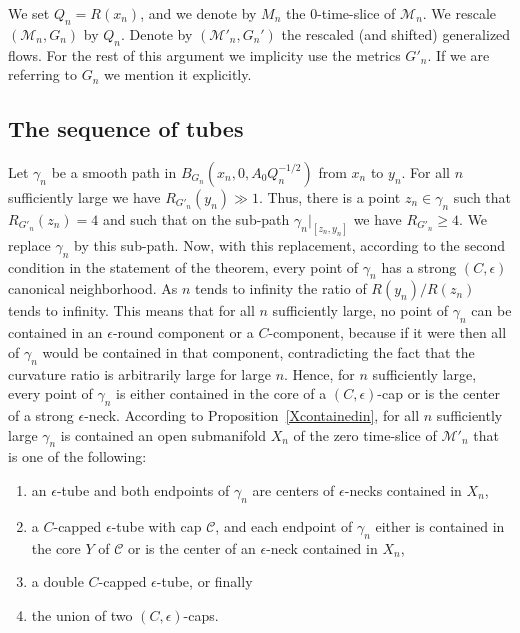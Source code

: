  We set $Q_n=R(x_n)$, and we denote by $M_n$ the $0$-time-slice of
${\mathcal M}_n$. We rescale $({\mathcal M}_n,G_n)$ by $Q_n$. Denote
by $({\mathcal M}'_n,G_n')$ the rescaled (and shifted) generalized
flows. For the rest of this argument we implicity use the metrics
$G'_n$. If we are referring to $G_n$ we mention it explicitly.

\subsection{The sequence of tubes}

 Let
$\gamma_n$ be a smooth path in $B_{G_n}(x_n,0,A_0Q_n^{-1/2})$ from
$x_n$ to $y_n$. For all $n$ sufficiently large we have
$R_{G'_n}(y_n) \gg 1$. Thus, there is a point $z_n\in \gamma_n$ such
that $R_{G'_n}(z_n)=4$ and such that on the sub-path
$\gamma_n|_{[z_n,y_n]}$ we have $R_{G'_n}\ge 4$. We replace
$\gamma_n$ by this sub-path. Now, with this replacement, according
to the second condition in the statement of the theorem, every point
of $\gamma_n$ has a strong $(C,\epsilon)$ canonical
neighborhood. As $n$ tends to infinity
the ratio of $R(y_n)/R(z_n)$ tends to infinity. This means that for
all $n$ sufficiently large, no point of  $\gamma_n$ can be contained
in an $\epsilon$-round component
or a $C$-component, because if it were then all
of $\gamma_n$ would be contained in that component, contradicting
the fact that the curvature ratio is arbitrarily large for large
$n$. Hence, for $n$ sufficiently large, every point of $\gamma_n$ is
either contained in the core of a
$(C,\epsilon)$-cap or is the center of a
strong $\epsilon$-neck. According to
Proposition~\ref{Xcontainedin}, for all $n$ sufficiently large
$\gamma_n$ is contained an open submanifold $X_n$ of the zero
time-slice of ${\mathcal M}'_n$ that is one of the following:
\begin{enumerate}
\item[(1)] an $\epsilon$-tube  and both endpoints of $\gamma_n$ are centers
of $\epsilon$-necks
contained in $X_n$,
\item[(2)] a $C$-capped $\epsilon$-tube with cap ${\mathcal C}$,
and each endpoint of $\gamma_n$ either is contained in the core $Y$
of ${\mathcal C}$ or is the center of an $\epsilon$-neck contained
in $X_n$,
\item[(3)] a double $C$-capped $\epsilon$-tube, or finally
\item[(4)] the union of two $(C,\epsilon)$-caps.
\end{enumerate}

